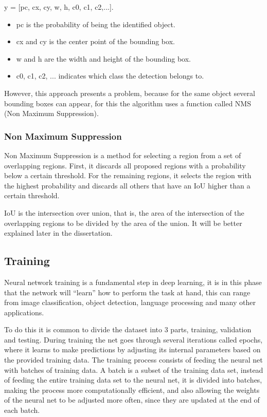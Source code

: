 y = [pc, cx, cy, w, h, c0, c1, c2,...].

\begin{itemize}
    \item pc is the probability of being the identified object.
    \item cx and cy is the center point of the bounding box.
    \item w and h are the width and height of the bounding box.
    \item c0, c1, c2, ... indicates which class the detection belongs to.
\end{itemize}

However, this approach presents a problem, because for the same object several bounding boxes can appear, for this the algorithm uses a function called NMS (Non Maximum Suppression).

\subsubsection{Non Maximum Suppression}
Non Maximum Suppression \cite{nonmaxsurpression} is a method for selecting a region from a set of overlapping regions. First, it discards all proposed regions with a probability below a certain threshold. For the remaining regions, it selects the region with the highest probability and discards all others that have an IoU higher than a certain threshold.

IoU is the intersection over union, that is, the area of the intersection of the overlapping regions to be divided by the area of the union. It will be better explained later in the dissertation.



\subsection{Training}
Neural network training is a fundamental step in deep learning, it is in this phase that the network will ``learn'' how to perform the task at hand, this can range from image classification, object detection, language processing and many other applications.

To do this it is common to divide the dataset into 3 parts, training, validation and testing. During training the net goes through several iterations called epochs, where it learns to make predictions by adjusting its internal parameters based on the provided training data.
The training process consists of feeding the neural net with batches of training data.
A batch is a subset of the training data set, instead of feeding the entire training data set to the neural net, it is divided into batches, making the process more computationally efficient, and also allowing the weights of the neural net to be adjusted more often, since they are updated at the end of each batch.

